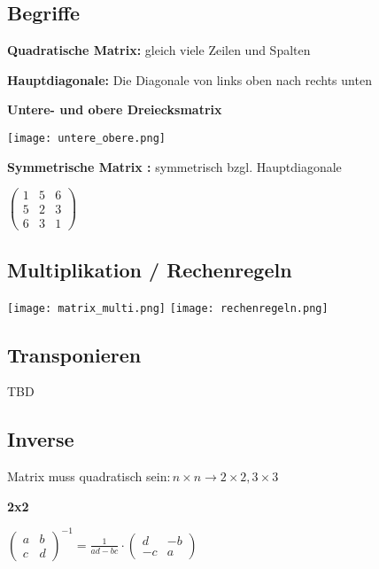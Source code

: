 \begin{multicols*}{3}
    \subsection{Begriffe}

    \textbf{Quadratische Matrix:} gleich viele Zeilen und Spalten

    \textbf{Hauptdiagonale:} Die Diagonale von links oben nach rechts unten

    \textbf{Untere- und obere Dreiecksmatrix}

    \texttt{[image: untere\_obere.png]}

    \textbf{Symmetrische Matrix :} symmetrisch bzgl. Hauptdiagonale

    $ \begin{pmatrix}
            1 & 5 & 6 \\
            5 & 2 & 3 \\
            6 & 3 & 1
        \end{pmatrix} $

    \WhiteSpace
    \subsection{Multiplikation / Rechenregeln}
    {\begin{multicols}{2}
            { \texttt{[image: matrix\_multi.png]} }
            \columnbreak
            { \texttt{[image: rechenregeln.png]} }
        \end{multicols}}

    \subsection{Transponieren}

    TBD

    \subsection{Inverse}
    {Matrix muss quadratisch sein$: n \times n \rightarrow 2\times2, 3\times3$}

    \textbf{2x2}

    {\large$\begin{pmatrix}
            a & b \\
            c & d
        \end{pmatrix}^{-1} = \frac{1}{ad-bc}\cdot\begin{pmatrix}
            d  & -b \\
            -c & a
        \end{pmatrix}$}


\end{multicols*}
